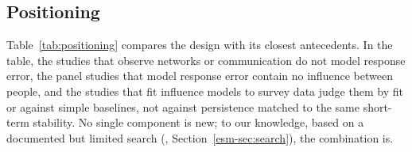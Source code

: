 \subsection{Positioning}\label{sec:bg-positioning}

Table~\ref{tab:positioning} compares the design with its closest antecedents. In the table, the studies that observe networks or communication do not model response error, the panel studies that model response error contain no influence between people, and the studies that fit influence models to survey data judge them by fit or against simple baselines, not against persistence matched to the same short-term stability. No single component is new; to our knowledge, based on a documented but limited search (\esmresource, Section~\ref{esm-sec:search}), the combination is.


